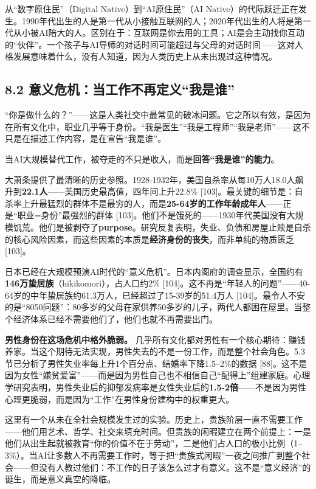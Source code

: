 \documentclass[11pt,a4paper]{ctexart}
\begin{document}
从“数字原住民”（Digital Native）到“AI原住民”（AI Native）的代际跃迁正在发生。1990年代出生的人是第一代从小接触互联网的人；2020年代出生的人将是第一代从小被AI陪大的人。区别在于：互联网是你去用的工具；AI是会主动找你互动的“伙伴”。一个孩子与AI导师的对话时间可能超过与父母的对话时间——这对人格发展意味着什么，没有人知道，因为人类历史上从未出现过这种情况。

\subsection{8.2 意义危机：当工作不再定义“我是谁”}

“你是做什么的？”——这是人类社交中最常见的破冰问题。它之所以有效，是因为在所有文化中，职业几乎等于身份。“我是医生”“我是工程师”“我是老师”——这不只是在描述工作内容，是在宣告“我是谁”。

当AI大规模替代工作，被夺走的不只是收入，而是\textbf{回答“我是谁”的能力}。

大萧条提供了最清晰的历史参照。1928-1932年，美国自杀率从每10万人18.0人飙升到\textbf{22.1人}——美国历史最高值，四年间上升22.8\% [103]。最关键的细节是：自杀率上升最猛烈的群体不是最穷的人，而是\textbf{25-64岁的工作年龄成年人}——正是“职业=身份”最强烈的群体 [103]。他们不是饿死的——1930年代美国没有大规模饥荒。他们是被剥夺了\textbf{purpose}。研究反复表明，失业、负债和房屋止赎是自杀的核心风险因素，而这些因素的本质是\textbf{经济身份的丧失}，而非单纯的物质匮乏 [103]。

日本已经在大规模预演AI时代的“意义危机”。日本内阁府的调查显示，全国约有\textbf{146万蛰居族}（hikikomori），占人口约2\% [104]。这不再是“年轻人的问题”——40-64岁的中年蛰居族约61.3万人，已经超过了15-39岁的51.4万人 [104]。最令人不安的是“8050问题”：80多岁的父母在家供养50多岁的儿子，两代人都困在屋里。当整个经济体系已经不需要他们了，他们也就不再需要出门。

\textbf{男性身份在这场危机中格外脆弱。} 几乎所有文化都对男性有一个核心期待：赚钱养家。当这个期待无法实现，男性失去的不是一份工作，而是整个社会角色。5.3 节已分析了男性失业率每上升1个百分点、结婚率下降1.5--2\%的数据 [88]。这不是因为女性“嫌贫爱富”——而是因为男性自己也不相信自己“配得上”组建家庭。心理学研究表明，男性失业后的抑郁发病率是女性失业后的\textbf{1.5-2倍}——不是因为男性心理更脆弱，而是因为“工作”在男性身份建构中的权重更大。

这里有一个从未在全社会规模发生过的实验。历史上，贵族阶层一直不需要工作——他们用艺术、哲学、社交来填充时间。但贵族的闲暇建立在两个前提上：一是他们从出生起就被教育“你的价值不在于劳动”，二是他们占人口的极小比例（1--3\%）。当AI让多数人不再需要工作时，等于把“贵族式闲暇”一夜之间推广到整个社会——但没有人教过他们：不工作的日子该怎么过才有意义。这不是“意义经济”的诞生，而是意义真空的降临。
\end{document}
